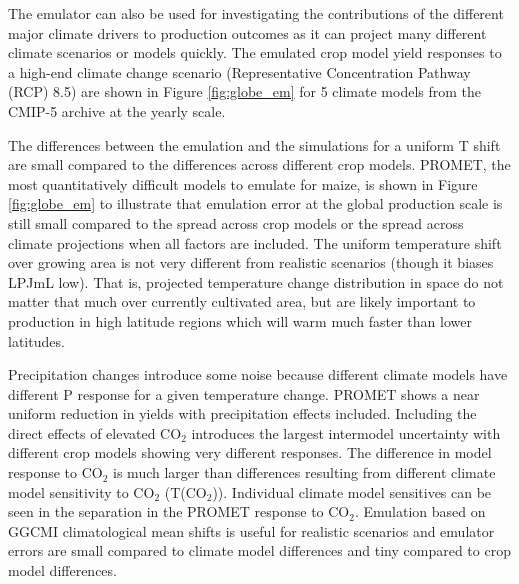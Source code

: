 \documentclass[gmd, manuscript]{copernicus} %
\begin{document}
The emulator can also be used for investigating the contributions of the different major climate drivers to production outcomes as it can project many different climate scenarios or models quickly.
The emulated crop model yield responses to a high-end climate change scenario (Representative Concentration Pathway (RCP) 8.5) are shown in Figure \ref{fig:globe_em} for 5 climate models from the CMIP-5 archive \citep{Taylor2012} at the yearly scale. 

The differences between the emulation and the simulations for a uniform T shift are small compared to the differences across different crop models.
PROMET, the most quantitatively difficult models to emulate for maize, is shown in Figure \ref{fig:globe_em} to illustrate that emulation error at the global production scale is still small compared to the spread across crop models or the spread across climate projections when all factors are included.
The uniform temperature shift over growing area is not very different from realistic scenarios (though it biases LPJmL low). 
That is, projected temperature change distribution in space do not matter that much over currently cultivated area, but are likely important to production in high latitude regions which will warm much faster than lower latitudes.

Precipitation changes introduce some noise because different climate models have different P response for a given temperature change. 
PROMET shows a near uniform reduction in yields with precipitation effects included.
Including the direct effects of elevated CO$_2$ introduces the largest intermodel uncertainty with different crop models showing very different responses. 
The difference in model response to CO$_2$ is much larger than differences resulting from different climate model sensitivity to CO$_2$ (T(CO$_2$)).
Individual climate model sensitives can be seen in the separation in the PROMET response to CO$_2$.
Emulation based on GGCMI climatological mean shifts is useful for realistic scenarios and emulator errors are small compared to climate model differences and tiny compared to crop model differences.

\end{document}
